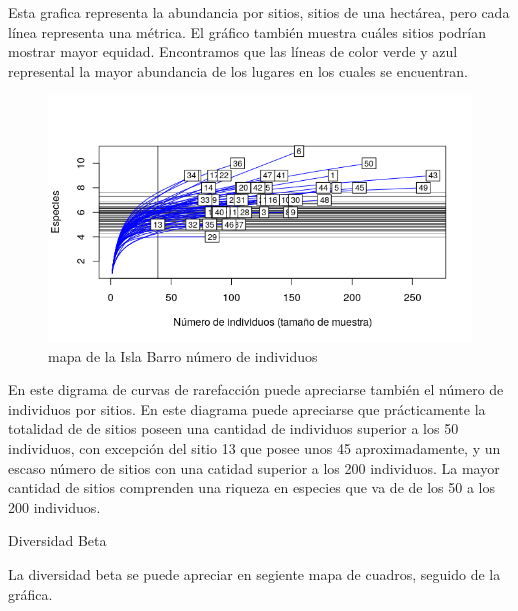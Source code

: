 \documentclass[11pt,]{article}
\begin{document}
Esta grafica representa la abundancia por sitios, sitios de una
hectárea, pero cada línea representa una métrica. El gráfico también
muestra cuáles sitios podrían mostrar mayor equidad. Encontramos que las
líneas de color verde y azul represental la mayor abundancia de los
lugares en los cuales se encuentran.

\begin{figure}
\centering
\includegraphics[width=1.00000\textwidth]{Numero_individuos.png}
\caption{mapa de la Isla Barro número de individuos \label{fig:bci_map}}
\end{figure}

En este digrama de curvas de rarefacción puede apreciarse también el
número de individuos por sitios. En este diagrama puede apreciarse que
prácticamente la totalidad de de sitios poseen una cantidad de
individuos superior a los 50 individuos, con excepción del sitio 13 que
posee unos 45 aproximadamente, y un escaso número de sitios con una
catidad superior a los 200 individuos. La mayor cantidad de sitios
comprenden una riqueza en especies que va de de los 50 a los 200
individuos.

Diversidad Beta

La diversidad beta se puede apreciar en segiente mapa de cuadros,
seguido de la gráfica.
\end{document}
